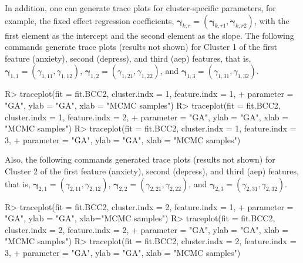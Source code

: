 In addition, one can generate trace plots for cluster-specific parameters, for example, the fixed effect regression coefficients, $\boldsymbol{\gamma}_{k, r} = (\boldsymbol{\gamma}_{k, r1}, \boldsymbol{\gamma}_{k, r2})$, with the first element as the intercept and the second element as the slope. The following commands generate trace plots (results not shown) for Cluster 1 of the first feature (anxiety), second (depress), and third (aep) features, that is,  $\boldsymbol{\gamma}_{1,1} = (\gamma_{1,11}, \gamma_{1,12})$,  $\boldsymbol{\gamma}_{1,2} = (\gamma_{1,21}, \gamma_{1,22})$, and $\boldsymbol{\gamma}_{1,3} = (\gamma_{1,31}, \gamma_{1,32})$. 
\begin{example}
R> traceplot(fit = fit.BCC2, cluster.indx = 1, feature.indx = 1,
+        parameter = "GA", ylab = "GA", xlab = "MCMC samples")
R> traceplot(fit = fit.BCC2, cluster.indx = 1, feature.indx = 2,
+        parameter = "GA", ylab = "GA", xlab = "MCMC samples")
R> traceplot(fit = fit.BCC2, cluster.indx = 1, feature.indx = 3,
+        parameter = "GA", ylab = "GA", xlab = "MCMC samples")
\end{example} 
Also, the following commands generated trace plots (results not shown) for Cluster 2 of the first feature (anxiety), second (depress), and third (aep) features, that is,  $\boldsymbol{\gamma}_{2,1} = (\gamma_{2,11}, \gamma_{2,12})$,  $\boldsymbol{\gamma}_{2,2} = (\gamma_{2,21}, \gamma_{2,22})$, and $\boldsymbol{\gamma}_{2,3} = (\gamma_{2,31}, \gamma_{2,32})$. 
\begin{example}
R> traceplot(fit = fit.BCC2, cluster.indx = 2, feature.indx = 1,
+        parameter = "GA", ylab = "GA", xlab="MCMC samples")
R> traceplot(fit = fit.BCC2, cluster.indx = 2, feature.indx = 2,
+        parameter = "GA", ylab = "GA", xlab = "MCMC samples")
R> traceplot(fit = fit.BCC2, cluster.indx = 2, feature.indx = 3,
+        parameter = "GA", ylab = "GA", xlab = "MCMC samples")
\end{example} 
